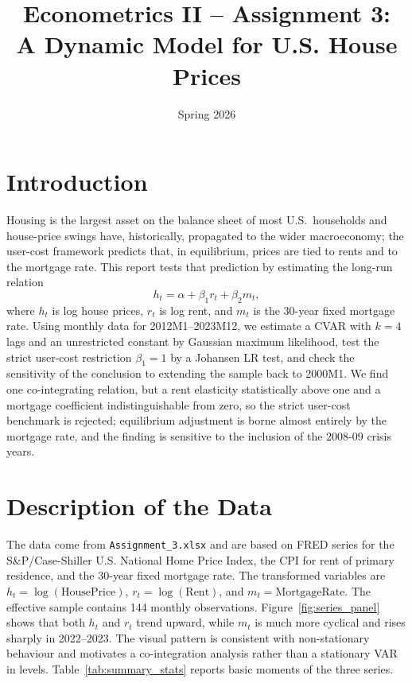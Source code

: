 \documentclass[12pt]{article}
\title{Econometrics II -- Assignment 3:\\
A Dynamic Model for U.S. House Prices}
\date{Spring 2026}
\begin{document}
\maketitle
\section{Introduction}

Housing is the largest asset on the balance sheet of most U.S.\ households and house-price swings have, historically, propagated to the wider macro\-economy; the user-cost framework predicts that, in equilibrium, prices are tied to rents and to the mortgage rate. This report tests that prediction by estimating the long-run relation
\begin{equation}
    h_t = \alpha + \beta_1 r_t + \beta_2 m_t,
\end{equation}
where $h_t$ is log house prices, $r_t$ is log rent, and $m_t$ is the 30-year fixed mortgage rate. Using monthly data for 2012M1--2023M12, we estimate a CVAR with $k=4$ lags and an unrestricted constant by Gaussian maximum likelihood, test the strict user-cost restriction $\beta_1=1$ by a Johansen LR test, and check the sensitivity of the conclusion to extending the sample back to 2000M1.
\newline
\newline
We find one co-integrating relation, but a rent elasticity statistically above one and a mortgage coefficient indistinguishable from zero, so the strict user-cost benchmark is rejected; equilibrium adjustment is borne almost entirely by the mortgage rate, and the finding is sensitive to the inclusion of the 2008-09 crisis years.
\section{Description of the Data}

The data come from \texttt{Assignment\_3.xlsx} and are based on FRED series for the S\&P/Case-Shiller U.S.
National Home Price Index, the CPI for rent of primary residence, and the 30-year fixed mortgage rate. The transformed variables are $h_t = \log(\text{HousePrice})$, $r_t = \log(\text{Rent})$, and $m_t = \text{MortgageRate}$. The effective sample contains 144 monthly observations.
\newline
\newline
Figure~\ref{fig:series_panel} shows that both $h_t$ and $r_t$ trend upward, while $m_t$ is much more cyclical and rises sharply in 2022--2023. The visual pattern is consistent with non-stationary behaviour and motivates a co-integration analysis rather than a stationary VAR in levels. Table~\ref{tab:summary_stats} reports basic moments of the three series.
\end{document}
